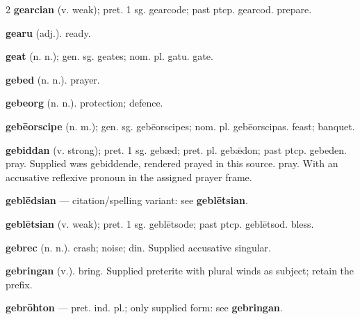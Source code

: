 \begin{multicols*}{2}
\textbf{gearcian} (v. weak); pret. 1 sg. gearcode; past ptcp. gearcod. prepare.\par
\textbf{gearu} (adj.). ready.\par
\textbf{geat} (n. n.); gen. sg. geates; nom. pl. gatu. gate.\par
\textbf{gebed} (n. n.). prayer.\par
\textbf{gebeorg} (n. n.). protection; defence.\par
\textbf{gebēorscipe} (n. m.); gen. sg. gebēorscipes; nom. pl. gebēorscipas. feast; banquet.\par
\textbf{gebiddan} (v. strong); pret. 1 sg. gebæd; pret. pl. gebǣdon; past ptcp. gebeden. pray. Supplied wæs gebiddende, rendered prayed in this source. pray. With an accusative reflexive pronoun in the assigned prayer frame.\par
\textbf{geblēdsian} — citation/spelling variant: see \textbf{geblētsian}.\par
\textbf{geblētsian} (v. weak); pret. 1 sg. geblētsode; past ptcp. geblētsod. bless.\par
\textbf{gebrec} (n. n.). crash; noise; din. Supplied accusative singular.\par
\textbf{gebringan} (v.). bring. Supplied preterite with plural winds as subject; retain the prefix.\par
\textbf{gebrōhton} — pret. ind. pl.; only supplied form: see \textbf{gebringan}.\par

\end{multicols*}
